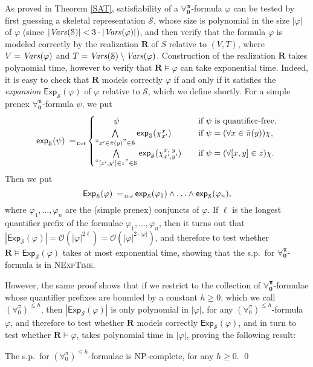 \documentclass[a4paper,UKenglish]{lipics}
\newcommand{\Lang}{\ensuremath{\mathbf{\forall_{0}^{\pi}}}\xspace}
\newcommand{\LangBounded}[1]{\ensuremath{(\forall_{0}^{\pi})^{\leq #1}}\xspace}
\newcommand{\nonpairs}[1]{\bar{\pi}(#1)}
\newcommand{\atset}{\mathcal{S}}
\newcommand{\expansion}[2]{\mathsf{exp}_{#2}(#1)}
\newcommand{\Expansion}[2]{\mathsf{Exp}_{#2}(#1)}
\newcommand{\aslit}[1]{\mbox{``}#1\mbox{''}}
\newcommand{\real}{\mathbf{R}}
\begin{document}
As proved in Theorem \ref{SAT}, satisfiability of a \Lang-formula
$\varphi$ can be tested by first guessing a skeletal representation
$\atset$, whose size is polynomial in the size $|\varphi|$ of
$\varphi$ (since $|\Vars(\atset)| < 3\cdot|\Vars(\varphi)|$), and then
verify that the formula $\varphi$ is modeled correctly by the
realization $\real$ of $S$ relative to $(V,T)$, where $V =
\mathit{Vars}(\varphi)$ and $T = \Vars(\atset) \setminus \Vars(\varphi)$.
Construction of the realization $\real$ takes polynomial time, however
to verify that $\real \models \varphi$ can take exponential time.
Indeed, it is easy to check that $\real$ models correctly $\varphi$ if
and only if it satisfies the \emph{expansion}
$\Expansion{\varphi}{\atset}$ of $\varphi$ relative to $\atset$,
which we define shortly. For a simple prenex \Lang-formula $\psi$, we
put
\[
 \expansion{\psi}{\atset} \defAs \begin{cases}
          \hspace{22pt}\psi & \text{if }\psi \text{ is quantifier-free},\\
% 	
	  \bigwedge\limits_{\aslit{x' \in \nonpairs{y}} \in \atset}
	  \expansion{\chi_{x'}^x}{\atset} & \text{if
	  }\psi=(\forall x \in \nonpairs{y})\chi,\\
% 	
	  \bigwedge\limits_{\aslit{[x',y'] \in z} \in \atset}
	  \expansion{\chi_{x',y'}^{x,\,\,y}}{\atset}~~~ & \text{if }
	  \psi=(\forall [x,y] \in z)\chi.
 \end{cases}
\]
Then we put
\[
\Expansion{\varphi}{\atset} \defAs
\expansion{\varphi_1}{\atset}\wedge
\ldots \wedge \expansion{\varphi_n}{\atset},
\]
where $\varphi_{1}, \ldots, \varphi_{n}$ are the (simple prenex)
conjuncts of $\varphi$. If $\ell$ is the longest quantifier prefix of
the formulae $\varphi_{1}, \ldots, \varphi_{n}$, then it turns out
that $|\Expansion{\varphi}{\atset}| =
\mathcal{O}(|\varphi|^{2\ell}) = \mathcal{O}(|\varphi|^{2\cdot|\varphi|})$, and therefore to test whether $\real
\models \Expansion{\varphi}{\atset}$ takes at most exponential time,
showing that the s.p.\ for \Lang-formula is in \textsc{NExpTime}.

However, the same proof shows that if we restrict to the collection of
\Lang-formulae whose quantifier prefixes are bounded by a constant $h
\geq 0$, which we call $\LangBounded{h}$, then
$|\Expansion{\varphi}{\atset}|$ is only polynomial in $|\varphi|$, for
any $\LangBounded{h}$-formula $\varphi$, and therefore to test whether
$\real$ models correctly $\Expansion{\varphi}{\atset}$, and in turn to
test whether $\real \models \varphi$, takes polynomial time in
$|\varphi|$, proving the following result:
\begin{corollary}\label{UDECSIZEBOUNDED}
The s.p.\ for $\LangBounded{h}$-formulae is \textsc{NP}-complete, for
any $h \geq 0$.
\qed
\end{corollary}
\end{document}
